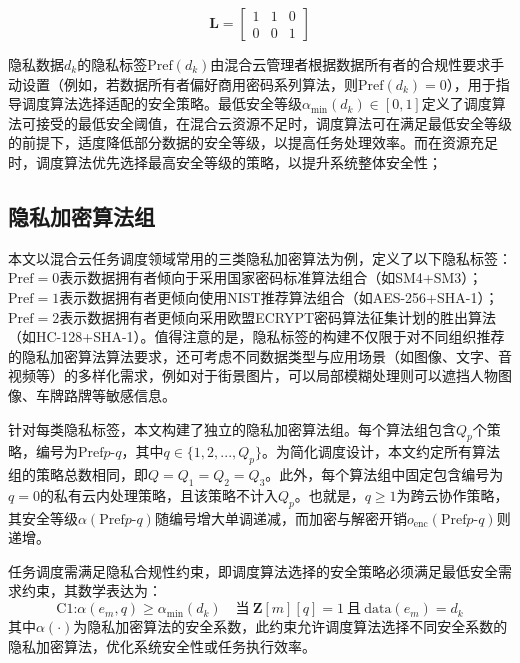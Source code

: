 \begin{equation}
    \mathbf{L} =
    \begin{bmatrix}
        1 & 1 & 0 \\
        0 & 0 & 1
    \end{bmatrix} \label{eq:loc-example}
\end{equation}

隐私数据\(d_k\)的隐私标签$\text{Pref}(d_k)$由混合云管理者根据数据所有者的合规性要求手动设置（例如，若数据所有者偏好商用密码系列算法，则$\text{Pref}(d_k)=0$），用于指导调度算法选择适配的安全策略。最低安全等级$\alpha_{\min}(d_k) \in [0,1]$定义了调度算法可接受的最低安全阈值，在混合云资源不足时，调度算法可在满足最低安全等级的前提下，适度降低部分数据的安全等级，以提高任务处理效率。而在资源充足时，调度算法优先选择最高安全等级的策略，以提升系统整体安全性；

\subsection{隐私加密算法组}

本文以混合云任务调度领域常用的三类隐私加密算法为例，定义了以下隐私标签：$\text{Pref}=0$表示数据拥有者倾向于采用国家密码标准算法组合（如SM4+SM3）；$\text{Pref}=1$表示数据拥有者更倾向使用NIST推荐算法组合（如AES-256+SHA-1）；$\text{Pref}=2$表示数据拥有者更倾向采用欧盟ECRYPT密码算法征集计划的胜出算法（如HC-128+SHA-1）。值得注意的是，隐私标签的构建不仅限于对不同组织推荐的隐私加密算法算法要求，还可考虑不同数据类型与应用场景（如图像、文字、音视频等）的多样化需求，例如对于街景图片，可以局部模糊处理则可以遮挡人物图像、车牌路牌等敏感信息。

针对每类隐私标签，本文构建了独立的隐私加密算法组。每个算法组包含$Q_p$个策略，编号为$\text{Pref}p\text{-}q$，其中$q \in \{1, 2, ..., Q_p\}$。为简化调度设计，本文约定所有算法组的策略总数相同，即$Q = Q_1 = Q_2 = Q_3$。此外，每个算法组中固定包含编号为$q=0$的私有云内处理策略，且该策略不计入$Q_p$。也就是，$q \geq 1$为跨云协作策略，其安全等级$\alpha(\text{Pref}p\text{-}q)$随编号增大单调递减，而加密与解密开销$o_\text{enc}(\text{Pref}p\text{-}q)$则递增。

任务调度需满足隐私合规性约束，即调度算法选择的安全策略必须满足最低安全需求约束，其数学表达为：
\begin{equation}
    \text{C1:}
    \alpha(e_m, q) \geq \alpha_{\min}(d_k) \quad \text{当} \ \mathbf{Z}[m][q]=1 \ \text{且} \ \text{data}(e_m)=d_k
    \label{eq:min-security}
\end{equation}
其中$\alpha(\cdot)$为隐私加密算法的安全系数，此约束允许调度算法选择不同安全系数的隐私加密算法，优化系统安全性或任务执行效率。

